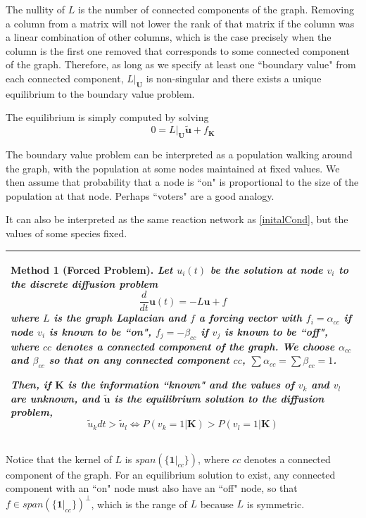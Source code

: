 \documentclass[10pt]{article}
\newtheorem{method}{Method}
\theoremstyle{definition}
\numberwithin{theorem}{section}
\numberwithin{definition}{section}
\numberwithin{lemma}{section}
\numberwithin{corollary}{section}
\numberwithin{clm}{section}
\numberwithin{rmk}{section}
\newenvironment{inbox2}
{\begin{center}
		\begin{tabular}{|p{0.9\textwidth}|}
			\hline \vspace{-0.5 cm}
		}
		{ 
			\\ \hline
		\end{tabular} 
	\end{center}
}
\renewcommand{\b}{\bm}
\begin{document}
The nullity of $L$ is the number of connected components of the graph. Removing a column from a matrix will not lower the rank of that matrix if the column was a linear combination of other columns, which is the case precisely when the column is the first one removed that corresponds to some connected component of the graph. Therefore, as long as we specify at least one ``boundary value" from each connected component, $L|_{\b{U}}$ is non-singular and there exists a unique equilibrium to the boundary value problem.

The equilibrium is simply computed by solving 
\[
0 = L|_{\b{U}}\b{\tilde{u}} + f_{\b{K}}
\]

The boundary value problem can be interpreted as a population walking around the graph, with the population at some nodes maintained at fixed values. We then assume that probability that a node is ``on" is proportional to the size of the population at that node. Perhaps ``voters" are a good analogy. 

It can also be interpreted as the same reaction network as \cref{initalCond}, but the values of some species fixed.

\begin{inbox2}
\begin{method}[Forced Problem]\label{forcing}
Let $u_i(t)$ be the solution at node $v_i$ to the discrete diffusion problem
\[
\frac{d}{dt}\b{u}(t)  = - L\b{u} + f
\]
where $L$ is the  graph Laplacian and $f$ a forcing vector with $f_i = \alpha_{cc}$ if node $v_i$ is known to be ``on", $f_j = -\beta_{cc}$ if $v_j$ is known to be ``off", where $cc$ denotes a connected component of the graph. We choose $\alpha_{cc}$ and $\beta_{cc}$ so that on any connected component $cc$, $\sum \alpha_{cc}= \sum \beta_{cc}= 1$. 

Then, if $\b{K}$ is the information ``known" and the values of $v_{k}$ and $v_{l}$ are unknown, and $\b{\tilde{u}}$ is the equilibrium solution to the diffusion problem,
\[
\tilde{u}_k dt >  \tilde{u}_l \Leftrightarrow  P(v_k=  1|\b{K}) > P(v_l = 1|\b{K})
\]
\end{method}
\end{inbox2}

Notice that the kernel of $L$ is $\mathit{span}(\{\b{1}|_{cc}\})$, where $cc$ denotes a connected component of the graph. For an equilibrium solution to exist, any connected component with an ``on" node must also have an ``off" node, so that $f \in \mathit{span}(\{\b{1}|_{cc}\})^{\perp}$, which is the range of $L$ because $L$ is symmetric. 
\end{document}
